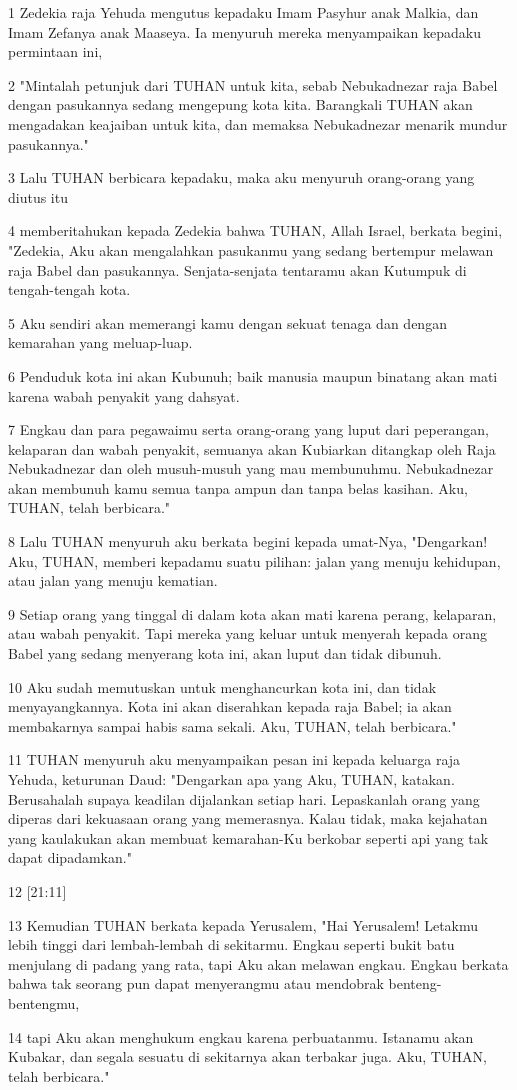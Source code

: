 \par 1 Zedekia raja Yehuda mengutus kepadaku Imam Pasyhur anak Malkia, dan Imam Zefanya anak Maaseya. Ia menyuruh mereka menyampaikan kepadaku permintaan ini,
\par 2 "Mintalah petunjuk dari TUHAN untuk kita, sebab Nebukadnezar raja Babel dengan pasukannya sedang mengepung kota kita. Barangkali TUHAN akan mengadakan keajaiban untuk kita, dan memaksa Nebukadnezar menarik mundur pasukannya."
\par 3 Lalu TUHAN berbicara kepadaku, maka aku menyuruh orang-orang yang diutus itu
\par 4 memberitahukan kepada Zedekia bahwa TUHAN, Allah Israel, berkata begini, "Zedekia, Aku akan mengalahkan pasukanmu yang sedang bertempur melawan raja Babel dan pasukannya. Senjata-senjata tentaramu akan Kutumpuk di tengah-tengah kota.
\par 5 Aku sendiri akan memerangi kamu dengan sekuat tenaga dan dengan kemarahan yang meluap-luap.
\par 6 Penduduk kota ini akan Kubunuh; baik manusia maupun binatang akan mati karena wabah penyakit yang dahsyat.
\par 7 Engkau dan para pegawaimu serta orang-orang yang luput dari peperangan, kelaparan dan wabah penyakit, semuanya akan Kubiarkan ditangkap oleh Raja Nebukadnezar dan oleh musuh-musuh yang mau membunuhmu. Nebukadnezar akan membunuh kamu semua tanpa ampun dan tanpa belas kasihan. Aku, TUHAN, telah berbicara."
\par 8 Lalu TUHAN menyuruh aku berkata begini kepada umat-Nya, "Dengarkan! Aku, TUHAN, memberi kepadamu suatu pilihan: jalan yang menuju kehidupan, atau jalan yang menuju kematian.
\par 9 Setiap orang yang tinggal di dalam kota akan mati karena perang, kelaparan, atau wabah penyakit. Tapi mereka yang keluar untuk menyerah kepada orang Babel yang sedang menyerang kota ini, akan luput dan tidak dibunuh.
\par 10 Aku sudah memutuskan untuk menghancurkan kota ini, dan tidak menyayangkannya. Kota ini akan diserahkan kepada raja Babel; ia akan membakarnya sampai habis sama sekali. Aku, TUHAN, telah berbicara."
\par 11 TUHAN menyuruh aku menyampaikan pesan ini kepada keluarga raja Yehuda, keturunan Daud: "Dengarkan apa yang Aku, TUHAN, katakan. Berusahalah supaya keadilan dijalankan setiap hari. Lepaskanlah orang yang diperas dari kekuasaan orang yang memerasnya. Kalau tidak, maka kejahatan yang kaulakukan akan membuat kemarahan-Ku berkobar seperti api yang tak dapat dipadamkan."
\par 12 [21:11]
\par 13 Kemudian TUHAN berkata kepada Yerusalem, "Hai Yerusalem! Letakmu lebih tinggi dari lembah-lembah di sekitarmu. Engkau seperti bukit batu menjulang di padang yang rata, tapi Aku akan melawan engkau. Engkau berkata bahwa tak seorang pun dapat menyerangmu atau mendobrak benteng-bentengmu,
\par 14 tapi Aku akan menghukum engkau karena perbuatanmu. Istanamu akan Kubakar, dan segala sesuatu di sekitarnya akan terbakar juga. Aku, TUHAN, telah berbicara."

